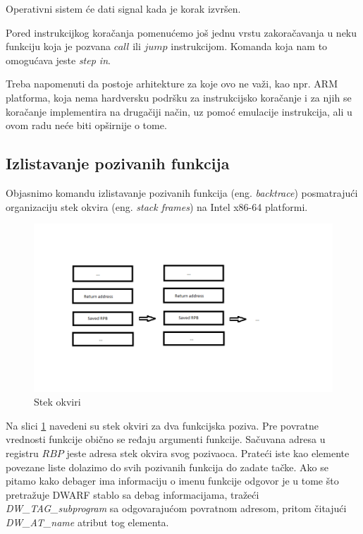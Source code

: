 \documentclass[12pt,oneside]{memoir}
\begin{document}
Operativni sistem će dati signal kada je korak izvršen.

Pored instrukcijkog koračanja pomenućemo još jednu vrstu zakoračavanja u neku funkciju koja je pozvana $call$ ili $jump$ instrukcijom. Komanda koja nam to omogućava jeste \emph{step in}.

Treba napomenuti da postoje arhitekture za koje ovo ne važi, kao npr. ARM platforma, koja nema hardversku podršku za instrukcijsko koračanje i za njih se koračanje implementira na drugačiji način, uz pomoć emulacije instrukcija, ali u ovom radu neće biti opširnije o tome.

\subsection{Izlistavanje pozivanih funkcija}

Objasnimo komandu izlistavanje pozivanih funkcija (eng. \emph{backtrace}) posmatrajući organizaciju stek okvira (eng. \emph{stack frames}) na Intel x86-64 platformi.

\begin{figure}[h!]
	\begin{center}
		\includegraphics[scale=0.6]{slike/stack_frame.png}
	\end{center}
	\caption{Stek okviri}
	\label{fig:stack}
\end{figure}

Na slici \ref{fig:stack} navedeni su stek okviri za dva funkcijska poziva. Pre povratne vrednosti funkcije obično se ređaju argumenti funkcije. Sačuvana adresa u registru $RBP$ jeste adresa stek okvira svog pozivaoca. Prateći iste kao elemente povezane liste dolazimo do svih pozivanih funkcija do zadate tačke. Ako se pitamo kako debager ima informaciju o imenu funkcije odgovor je u tome što pretražuje DWARF stablo sa debag informacijama, tražeći \emph{DW\_TAG\_subprogram} sa odgovarajućom povratnom adresom, pritom čitajući \emph{DW\_AT\_name} atribut tog elementa.
\end{document}
